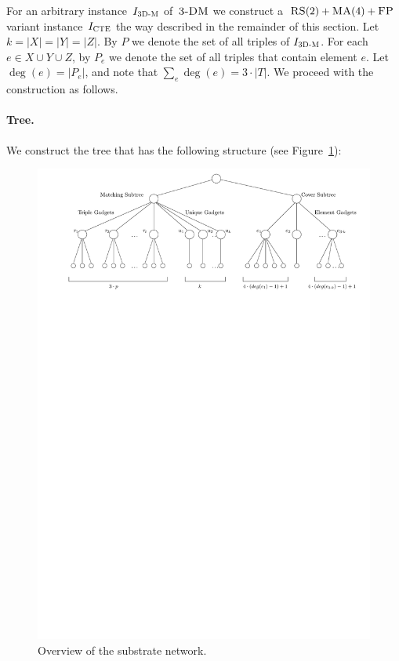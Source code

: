  For an arbitrary instance~$I_{\mathrm{\textsc{3D-M}}}$ of~$\textsc{3-DM}$ we construct a~$\textsc{RS}(2)+\textsc{MA}(4)+\textsc{FP}$ variant instance~$I_{\mathrm{\textsc{CTE}}}$ the way described in the remainder of this section.
Let $k = |X|=|Y|=|Z|$.
By $P$ we denote the set of all triples of $I_{\mathrm{\textsc{3D-M}}}$.
For each $e\in X\cup Y\cup Z$, by $P_e$ we denote the set of all triples that contain element $e$.
Let $\deg(e) = |P_e|$, and note that $\sum_e \deg(e) = 3\cdot |T|$.
We proceed with the construction as follows.

\paragraph{Tree.}
We construct the tree that has the following structure (see Figure~\ref{fig:red-ma2}):

\begin{figure}[t]
  \centering
  \includegraphics[width=0.9\columnwidth]{figs/static-mapping/overview}
  \caption{Overview of the substrate network.}
  \label{fig:red-ma2}
\end{figure}


